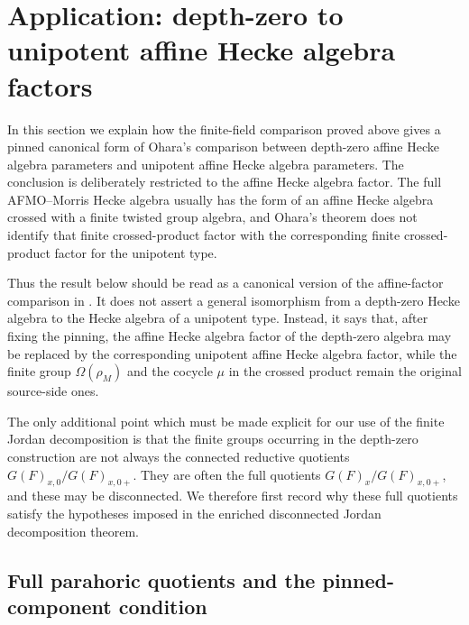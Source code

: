 \documentclass{amsart}
\theoremstyle{plain}
\numberwithin{equation}{section}
\theoremstyle{definition}
\begin{document}
\section{Application: depth-zero to unipotent affine Hecke algebra factors}
\label{sec:padic-depth0-to-unipotent-hecke}
\label{sec:finite-depthzero-to-unipotent-hecke}

In this section we explain how the finite-field comparison proved above gives a
pinned canonical form of Ohara's comparison between depth-zero affine Hecke
algebra parameters and unipotent affine Hecke algebra parameters.  The conclusion
is deliberately restricted to the affine Hecke algebra factor.  The full
AFMO--Morris Hecke algebra usually has the form of an affine Hecke algebra
crossed with a finite twisted group algebra, and Ohara's theorem does not identify
that finite crossed-product factor with the corresponding finite crossed-product
factor for the unipotent type.

Thus the result below should be read as a canonical version of the affine-factor
comparison in \cite[Theorem~4.4.1]{ohara2025}.  It does not assert a general
isomorphism from a depth-zero Hecke algebra to the Hecke algebra of a unipotent
type.  Instead, it says that, after fixing the pinning, the affine Hecke algebra
factor of the depth-zero algebra may be replaced by the corresponding unipotent
affine Hecke algebra factor, while the finite group \(\Omega(\rho_M)\) and the
cocycle \(\mu\) in the crossed product remain the original source-side ones.

The only additional point which must be made explicit for our use of the finite
Jordan decomposition is that the finite groups occurring in the depth-zero
construction are not always the connected reductive quotients
\(G(F)_{x,0}/G(F)_{x,0+}\).  They are often the full quotients
\(G(F)_x/G(F)_{x,0+}\), and these may be disconnected.  We therefore first record
why these full quotients satisfy the hypotheses imposed in the enriched
disconnected Jordan decomposition theorem.

\subsection{Full parahoric quotients and the pinned-component condition}
\label{subsec:parahoric-quotients-pinned-condition}
\end{document}
